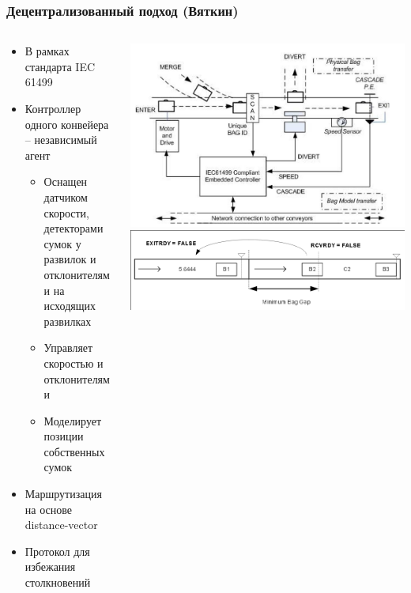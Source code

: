 \documentclass{beamer}
\begin{document}
\begin{frame}
  \frametitle{Децентрализованный подход (Вяткин)}
  \begin{columns}
    \begin{column}{0.5\textwidth}
      \begin{itemize}
      \item В рамках стандарта IEC 61499
      \item Контроллер одного конвейера -- независимый агент
        \begin{itemize}
        \item Оснащен датчиком скорости, детекторами сумок у развилок и отклонителями на исходящих развилках
        \item Управляет скоростью и отклонителями
        \item Моделирует позиции собственных сумок
        \end{itemize}
      \item Маршрутизация на основе distance-vector
      \item Протокол для избежания столкновений
      \end{itemize}
    \end{column}
    \begin{column}{0.5\textwidth}
      \begin{center}
        \includegraphics[width=\textwidth]{vyatkin-conveyors-illustration}
        \includegraphics[width=\textwidth]{collision-avoidance-1}
      \end{center}
    \end{column}
  \end{columns}
\end{frame}
\end{document}
